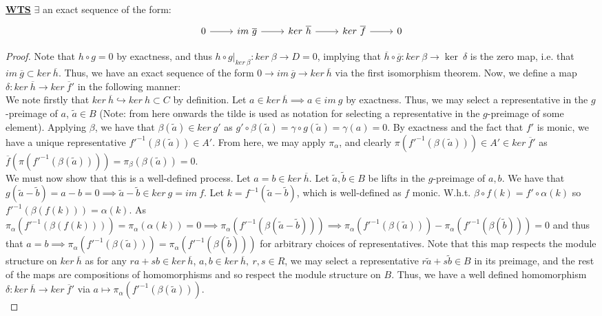 \documentclass{article}
\begin{document}
\vspace{0.1in}
\textbf{\underline{WTS}} $\exists$ an exact sequence of the form:
\[
  \begin{tikzcd}
0 \arrow[r] & im \ \overline g \arrow[r] & ker \ \overline h \arrow[r] & ker \ \overline f \arrow[r] & 0
\end{tikzcd}
\]

\begin{proof}
  Note that $h \circ g = 0$ by exactness, and thus $h \circ g|_{ker \ \beta}:ker \ \beta \to D = 0$, implying that $\overline h \circ \overline g: ker \ \beta \to \ker \ \delta$ is the zero map, i.e. that $im \ \overline g \subset ker \ \overline h$. Thus, we have an exact sequence of the form $0 \to im \ \overline g \to ker \ \overline h$ via the first isomorphism theorem. Now, we define a map $\delta: ker \ \overline h \to ker \ \overline f'$ in the following manner: \\
  We note firstly that $ker \ \overline h \hookrightarrow ker \ h \subset C$ by definition. Let $a \in ker \ \overline h \implies a \in im \ g$ by exactness. Thus, we may select a representative in the $g$-preimage of $a$, $\widetilde a \in B$ (Note: from here onwards the tilde is used as notation for selecting a representative in the $g$-preimage of some element). Applying $\beta$, we have that $\beta(\widetilde a) \in ker \ g'$ as $g' \circ \beta(\widetilde a) = \gamma \circ g (\widetilde a) = \gamma(a) = 0$. By exactness and the fact that $f'$ is monic, we have a unique representative $f'^{-1}(\beta(\widetilde a)) \in A'$. From here, we may apply $\pi_{\alpha}$, and clearly $\pi(f'^{-1}(\beta(\widetilde a))) \in A' \in ker \ \overline f'$ as $\overline f(\pi(f'^{-1}(\beta(\widetilde a)))) = \pi_{\beta}(\beta(\widetilde a)) = 0$.  \\

  We must now show that this is a well-defined process. Let $a = b \in ker \ \overline h$. Let $\widetilde a, \widetilde b \in B$ be lifts in the $g$-preimage of $a, b$. We have that $g(\widetilde a - \widetilde b) = a - b = 0 \implies  \widetilde a - \widetilde b \in ker \ g = im \ f$. Let $k = f^{-1}(\widetilde a - \widetilde b)$, which is well-defined as $f$ monic. W.h.t. $\beta \circ f(k) = f' \circ \alpha(k)$ so $f'^{-1}(\beta (f(k))) = \alpha(k)$. As $\pi_{\alpha}(f'^{-1}(\beta (f(k)))) = \pi_{\alpha}(\alpha(k)) = 0 \implies \pi_{\alpha}(f'^{-1}(\beta (\widetilde a - \widetilde b))) \implies \pi_{\alpha}(f'^{-1}(\beta (\widetilde a))) - \pi_{\alpha}(f'^{-1}(\beta (\widetilde b))) = 0$ and thus that $a=b \implies \pi_{\alpha}(f'^{-1}(\beta (\widetilde a))) = \pi_{\alpha}(f'^{-1}(\beta (\widetilde b)))$ for arbitrary choices of representatives. Note that this map respects the module structure on $ker \ \overline h$ as for any $ra + sb \in ker \ \overline h$, $a,b \in ker \ \overline h, \ r,s \in R$, we may select a representative $r \widetilde a + s \widetilde b \in B$ in its preimage, and the rest of the maps are compositions of homomorphisms and so respect the module structure on $B$. Thus, we have a well defined homomorphism $\delta: ker \ \overline h \to ker \ \overline f'$ via $a \mapsto \pi_{\alpha}(f'^{-1}(\beta (\widetilde a)))$. \\


\end{proof}
\end{document}

